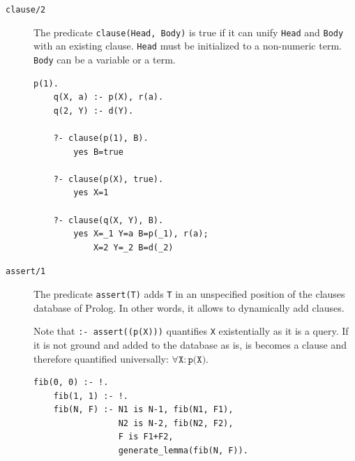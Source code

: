 \begin{description}
    \item[\texttt{clause/2}] 
        The predicate \texttt{clause(Head, Body)} is true if it can unify \texttt{Head} and \texttt{Body} with an existing clause.
        \texttt{Head} must be initialized to a non-numeric term. \texttt{Body} can be a variable or a term.

        \begin{example} \phantom{}
            \begin{lstlisting}[language={}]
    p(1).
    q(X, a) :- p(X), r(a).
    q(2, Y) :- d(Y).

    ?- clause(p(1), B).
        yes B=true

    ?- clause(p(X), true).
        yes X=1
    
    ?- clause(q(X, Y), B).
        yes X=_1 Y=a B=p(_1), r(a);
            X=2 Y=_2 B=d(_2)
            \end{lstlisting}  
        \end{example}

    \item[\texttt{assert/1}] 
        The predicate \texttt{assert(T)} adds \texttt{T} in an unspecified position of the clauses database of Prolog.
        In other words, it allows to dynamically add clauses.

        Note that \texttt{:- assert((p(X)))} quantifies \texttt{X} existentially as it is a query.
        If it is not ground and added to the database as is, 
        is becomes a clause and therefore quantified universally: $\forall \texttt{X}: \texttt{p(X)}$.

        \begin{example} \phantom{}
            \begin{lstlisting}[language={}]
    fib(0, 0) :- !.
    fib(1, 1) :- !.
    fib(N, F) :- N1 is N-1, fib(N1, F1),
                 N2 is N-2, fib(N2, F2),
                 F is F1+F2,
                 generate_lemma(fib(N, F)).


\end{lstlisting}
\end{example}
\end{description}
